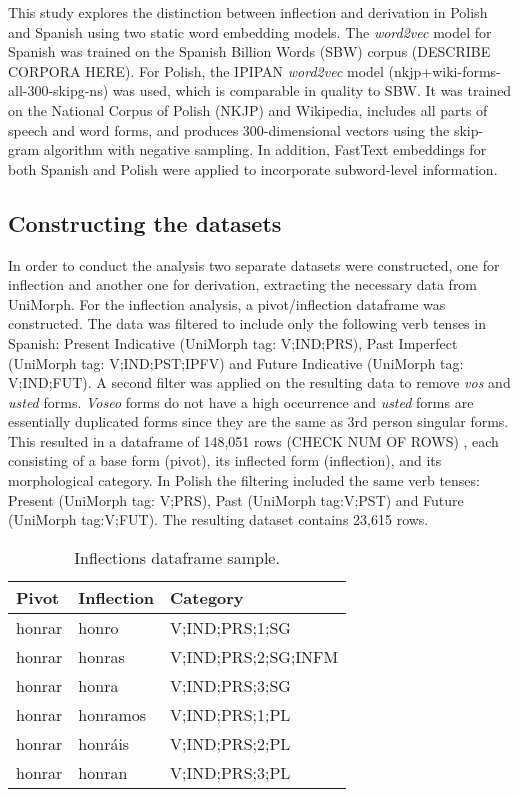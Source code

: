 \documentclass[12pt]{article}
\begin{document}
This study explores the distinction between inflection and derivation in Polish and Spanish using two static word embedding models. The \textit{word2vec} model for Spanish was trained on the Spanish Billion Words (SBW) corpus (DESCRIBE CORPORA HERE). For Polish, the IPIPAN \textit{word2vec} model (nkjp+wiki-forms-all-300-skipg-ns) was used, which is comparable in quality to SBW. It was trained on the National Corpus of Polish (NKJP) and Wikipedia, includes all parts of speech and word forms, and produces 300-dimensional vectors using the skip-gram algorithm with negative sampling. In addition, FastText embeddings for both Spanish and Polish were applied to incorporate subword-level information.



\subsection{Constructing the datasets}

In order to conduct the analysis two separate datasets were constructed, one for inflection and another one for derivation, extracting the necessary data from UniMorph. For the inflection analysis, a pivot/inflection dataframe was constructed. The data was filtered to include only the following verb tenses in Spanish: Present Indicative (UniMorph tag: V;IND;PRS), Past Imperfect (UniMorph tag: V;IND;PST;IPFV) and Future Indicative (UniMorph tag: V;IND;FUT). A second filter was applied on the resulting data to remove \textit{vos} and \textit{usted} forms. \textit{Voseo} forms do not have a high occurrence and \textit{usted} forms are essentially duplicated forms since they are the same as 3rd person singular forms. This resulted in a dataframe of 148,051 rows (CHECK NUM OF ROWS) , each consisting of a base form (pivot), its inflected form (inflection), and its morphological category. In Polish the filtering included the same verb tenses: Present (UniMorph tag: V;PRS), Past (UniMorph tag:V;PST) and Future (UniMorph tag:V;FUT). The resulting dataset contains 23,615 rows. 

\begin{table}[h!]
    \centering
    \small
    \begin{tabular}{lll}
        \toprule
        \textbf{Pivot} & \textbf{Inflection} & \textbf{Category} \\ 
        \midrule
        honrar	& honro &	V;IND;PRS;1;SG \\
        honrar	& honras &	V;IND;PRS;2;SG;INFM \\
        honrar	& honra &	V;IND;PRS;3;SG \\
        honrar	& honramos &	V;IND;PRS;1;PL \\
        honrar	& honráis &	V;IND;PRS;2;PL \\
        honrar	& honran &	V;IND;PRS;3;PL \\
        \bottomrule
    \end{tabular}
    \caption{Inflections dataframe sample.}
    \label{tab:infl-sample}
\end{table}
\end{document}
